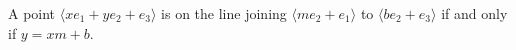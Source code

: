 A point $\langle x e_1 + y e_2 + e_3 \rangle$ is on the line joining $\langle m e_2 + e_1 \rangle$ to $\langle b e_2 + e_3 \rangle$ if and only if $y = xm + b$.
